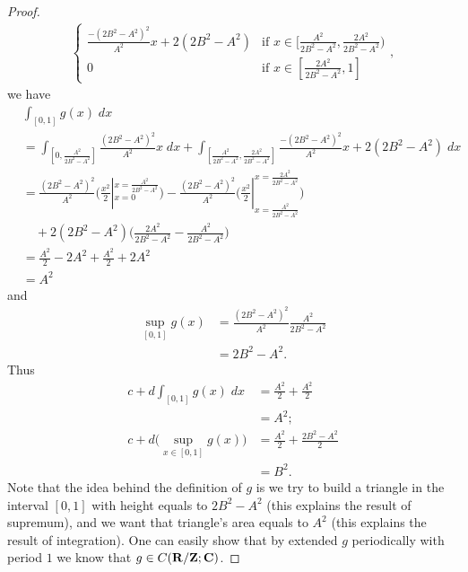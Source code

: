 \begin{proof}
\begin{align*}
\begin{cases}
                                      \frac{-(2 B^2 - A^2)^2}{A^2} x + 2 (2 B^2 - A^2) & \text{if } x \in [\frac{A^2}{2 B^2 - A^2}, \frac{2 A^2}{2 B^2 - A^2}) \\
                                      0                                                & \text{if } x \in [\frac{2 A^2}{2 B^2 - A^2}, 1]
                                    \end{cases},
  \end{align*}
  we have
  \begin{align*}
     & \int_{[0, 1]} g(x) \; dx                                                                                                                                                                                              \\
     & = \int_{[0, \frac{A^2}{2 B^2 - A^2}]} \frac{(2 B^2 - A^2)^2}{A^2} x \; dx + \int_{[\frac{A^2}{2 B^2 - A^2}, \frac{2 A^2}{2 B^2 - A^2}]} \frac{-(2 B^2 - A^2)^2}{A^2} x + 2 (2 B^2 - A^2) \; dx                        \\
     & = \frac{(2 B^2 - A^2)^2}{A^2} \bigg(\frac{x^2}{2}|_{x = 0}^{x = \frac{A^2}{2 B^2 - A^2}}\bigg) - \frac{(2 B^2 - A^2)^2}{A^2} \bigg(\frac{x^2}{2}|_{x = \frac{A^2}{2 B^2 - A^2}}^{x = \frac{2 A^2}{2 B^2 - A^2}}\bigg) \\
     & \quad + 2 (2 B^2 - A^2) \bigg(\frac{2 A^2}{2 B^2 - A^2} - \frac{A^2}{2 B^2 - A^2}\bigg)                                                                                                                               \\
     & = \frac{A^2}{2} - 2 A^2 + \frac{A^2}{2} + 2 A^2                                                                                                                                                                       \\
     & = A^2
  \end{align*}
  and
  \begin{align*}
    \sup_{[0, 1]} g(x) & = \frac{(2 B^2 - A^2)^2}{A^2} \frac{A^2}{2 B^2 - A^2} \\
                       & = 2 B^2 - A^2.
  \end{align*}
  Thus
  \begin{align*}
    c + d \int_{[0, 1]} g(x) \; dx           & = \frac{A^2}{2} + \frac{A^2}{2}         \\
                                             & = A^2;                                  \\
    c + d \big(\sup_{x \in [0, 1]} g(x)\big) & = \frac{A^2}{2} + \frac{2 B^2 - A^2}{2} \\
                                             & = B^2.
  \end{align*}
  Note that the idea behind the definition of \(g\) is we try to build a triangle in the interval \([0, 1]\) with height equals to \(2 B^2 - A^2\) (this explains the result of supremum), and we want that triangle's area equals to \(A^2\) (this explains the result of integration).
  One can easily show that by extended \(g\) periodically with period \(1\) we know that \(g \in C(\mathbf{R} / \mathbf{Z} ; \mathbf{C})\).
\end{proof}

